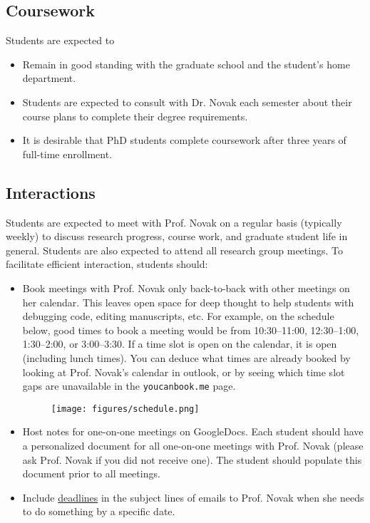\documentclass[12pt,twoside]{article}
\begin{document}
\subsection*{Coursework}

Students are expected to 
%
\begin{itemize}
\item Remain in good standing with the graduate school and the student's home department.
\item Students are expected to consult with Dr. Novak each semester about their course plans to complete their degree requirements.
\item It is desirable that PhD students complete coursework after three years of full-time enrollment. 
\end{itemize}

\subsection*{Interactions}

Students are expected to meet with Prof. Novak on a regular basis (typically weekly) to discuss research progress, course work, and graduate student life in general. Students are also expected to attend all research group meetings. To facilitate efficient interaction, students should: 
%
\begin{itemize}
\item Book meetings with Prof. Novak only back-to-back with other meetings on her calendar. This leaves open space for deep thought to help students with debugging code, editing manuscripts, etc. For example, on the schedule below, good times to book a meeting would be from 10:30--11:00, 12:30--1:00, 1:30--2:00, or 3:00--3:30. If a time slot is open on the calendar, it is open (including lunch times). You can deduce what times are already booked by looking at Prof. Novak's calendar in outlook, or by seeing which time slot gaps are unavailable in the {\tt youcanbook.me} page.

\begin{figure}[htb!]
\centering
\texttt{[image: figures/schedule.png]}
\end{figure}

\item Host notes for one-on-one meetings on GoogleDocs. Each student should have a personalized document for all one-on-one meetings with Prof. Novak (please ask Prof. Novak if you did not receive one). The student should populate this document prior to all meetings.
\item Include \underline{deadlines} in the subject lines of emails to Prof. Novak when she needs to do something by a specific date.
\end{itemize}
\end{document}
